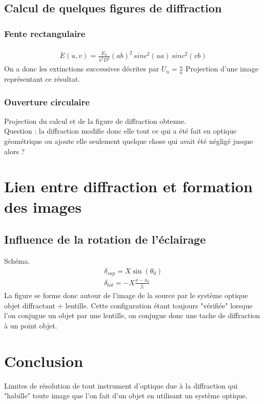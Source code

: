 \documentclass[12pt,prb,aps,epsf]{report}
\begin{document}
\subsection{Calcul de quelques figures de diffraction}
\subsubsection{Fente rectangulaire}
\begin{eqnarray}
\acute{E}(u,v) = \frac{\acute{E}_0}{\lambda^2D^2}(ab)^2\,sinc^2(ua)\,sinc^2(vb)
\end{eqnarray}
On a donc les extinctions successives décrites par $U_n =\frac{n}{a}$ Projection d'une image représentant ce résultat.
\subsubsection{Ouverture circulaire}
Projection du calcul et de la figure de diffraction obtenue.\\

Question : la diffraction modifie donc elle tout ce qui a été fait en optique géométrique ou ajoute elle seulement quelque chose qui avait été négligé jusque alors ?

\section{Lien entre diffraction et formation des images}
\subsection{Influence de la rotation de l'éclairage}

Schéma. 
\begin{eqnarray}
\delta_{sup} = X\sin(\theta_0)\\
\delta_{tot} = -X\frac{x-x_0}{f_i}
\end{eqnarray}
La figure se forme donc autour de l'image de la source par le système optique objet diffractant + lentille. Cette configuration étant toujours "vérifiée" lorsque l'on conjugue un objet par une lentille, on conjugue donc une tache de diffraction à un point objet.

\section*{Conclusion}
Limites de résolution de tout instrument d'optique due à la diffraction qui "habille" toute image que l'on fait d'un objet en utilisant un système optique.
\end{document}
